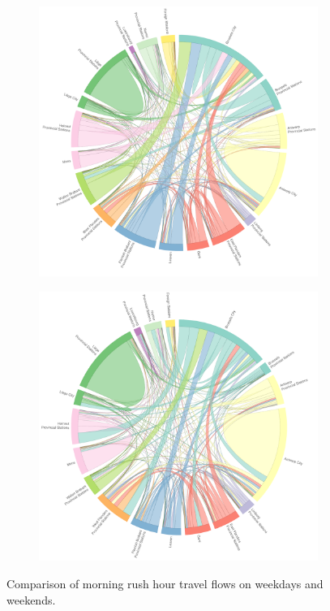 \documentclass{sig-alternate}
\begin{document}
\begin{figure}
  \centering
  \begin{subfigure}{.95\textwidth}
    \centering
    \includegraphics[width=13cm]{weekdays_morning.pdf}\\
    \label{fig:weekdays_morning}
  \end{subfigure}
  \begin{subfigure}{.95\textwidth}
    \centering
    \includegraphics[width=13cm]{weekends_morning.pdf}\\
    \label{fig:weekends_morning}
  \end{subfigure}
  \vspace{5.0pt}%
  \caption{Comparison of morning rush hour travel flows on weekdays and weekends.}
  \label{fig:mornings}
\end{figure}
\end{document}
